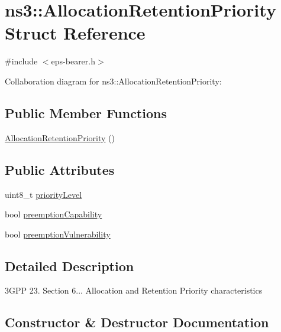 \hypertarget{structns3_1_1AllocationRetentionPriority}{}\section{ns3\+:\+:Allocation\+Retention\+Priority Struct Reference}
\label{structns3_1_1AllocationRetentionPriority}


{\ttfamily \#include $<$eps-\/bearer.\+h$>$}



Collaboration diagram for ns3\+:\+:Allocation\+Retention\+Priority\+:
\subsection*{Public Member Functions}
\begin{DoxyCompactItemize}
\item 
\hyperlink{structns3_1_1AllocationRetentionPriority_ac5b982204ffdf447df5d7289820fb739}{Allocation\+Retention\+Priority} ()
\end{DoxyCompactItemize}
\subsection*{Public Attributes}
\begin{DoxyCompactItemize}
\item 
uint8\+\_\+t \hyperlink{structns3_1_1AllocationRetentionPriority_a8b4f5cf9b31a4994f98ac7740ca3f5aa}{priority\+Level}
\item 
bool \hyperlink{structns3_1_1AllocationRetentionPriority_a5467cfb22333fcda452cd797225b04dd}{preemption\+Capability}
\item 
bool \hyperlink{structns3_1_1AllocationRetentionPriority_a29216b3ead08a2dba4eacf84a3b3fc35}{preemption\+Vulnerability}
\end{DoxyCompactItemize}


\subsection{Detailed Description}
3\+G\+PP 23. Section 6... Allocation and Retention Priority characteristics 

\subsection{Constructor \& Destructor Documentation}
